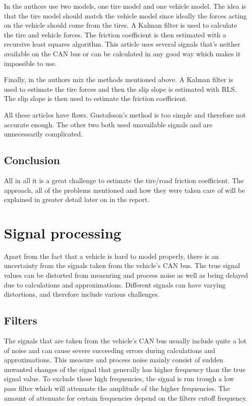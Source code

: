 In \cite{linearized} the authors use two models, one tire model and one vehicle model. The idea is that the tire model should match the vehicle model since ideally the forces acting on the vehicle should come from the tires. A Kalman filter is used to calculate the tire and vehicle forces. The friction coefficient is then estimated with a recursive least squares algorithm. This article uses several signals that's neither available on the CAN bus or can be calculated in any good way which makes it impossible to use.

Finally, in \cite{novelcost} the authors mix the methods mentioned above. A Kalman filter is used to estimate the tire forces and then the slip slope is estimated with RLS. The slip slope is then used to estimate the friction coefficient. 

All these articles have flaws. Gustafsson's method is too simple and therefore not accurate enough. The other two both used unavailable signals and are unnecessarily complicated. 


\subsection{Conclusion}
All in all it is a great challenge to estimate the tire/road friction coefficient. The approach, all of the problems mentioned and how they were taken care of will be explained in greater detail later on in the report.

\section{Signal processing}

Apart from the fact that a vehicle is hard to model properly, there is an uncertainty from the signals taken from the vehicle's CAN bus. The true signal values can be distorted from measuring and process noise as well as being delayed due to calculations and approximations. Different signals can have varying distortions, and therefore include various challenges.

\subsection{Filters}

The signals that are taken from the vehicle's CAN bus usually include quite a lot of noise and can cause severe succeeding errors during calculations and approximations. This measure and process noise mainly consist of sudden unwanted changes of the signal that generally has higher frequency than the true signal value. To exclude these high frequencies, the signal is run trough a low pass filter which will attenuate the amplitude of the higher frequencies. The amount of attenuate for certain frequencies depend on the filters cutoff frequency. 

